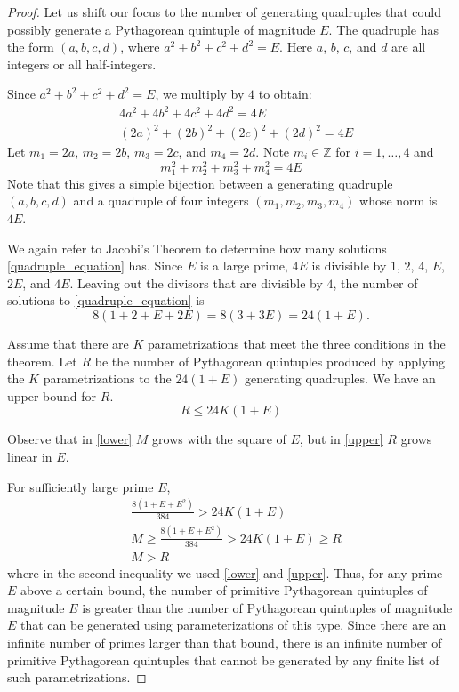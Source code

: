 \documentclass[12pt,table]{article}
\theoremstyle{definition}
\theoremstyle{remark}
\newcommand{\Zzz}{\mathbb Z}
\numberwithin{equation}{section}
\begin{document}
\begin{proof}
Let us shift our focus to the number of generating quadruples that could 
possibly generate a Pythagorean quintuple of magnitude $E$.
The quadruple has the form $(a,b,c,d)$, 
where $a^2 + b^2 + c^2 + d^2 = E$. 
Here $a$, $b$, $c$, and $d$ are all integers or all half-integers.

Since $a^2 + b^2 + c^2 + d^2 = E$, we multiply by $4$ to obtain:
\begin{align*}
     & 4a^2 + 4b^2 + 4c^2 + 4d^2 = 4E\\
     & (2a)^2 + (2b)^2 + (2c)^2 + (2d)^2 = 4E
\end{align*}
Let $m_1 = 2a$, $m_2 = 2b$, $m_3 = 2c$, 
and $m_4 = 2d$.
Note $m_i \in \Zzz$ for $i = 1, \ldots, 4$ and
\begin{equation}
\label{quadruple_equation}
m_1^2 + m_2^2 + m_3^2 + m_4^2 = 4E
\end{equation}
Note that this gives 
a simple bijection between a generating quadruple
 $(a,b,c,d)$ and a quadruple of four integers $(m_1,m_2,m_3,m_4)$ whose norm is $4E$.

We again refer to
Jacobi's Theorem to
determine how many solutions
\eqref{quadruple_equation} has.
Since $E$ is a large
prime,
$4E$ is divisible by $1$, $2$, $4$, $E$, $2E$, and $4E$. 
Leaving 
out the divisors that are divisible by $4$, 
the number of solutions to \eqref{quadruple_equation}
is 
$$
     8(1 + 2 + E + 2E) = 8(3 + 3E) = 24(1 + E).
$$


Assume that there are $K$ parametrizations
that meet the three conditions in the theorem. 
Let $R$ be the number of Pythagorean quintuples produced by applying
the $K$ parametrizations to the $24(1+E)$ generating quadruples. 
We have
an upper bound for $R$.
\begin{equation}
\label{upper}
R \leq 24K(1+E)
\end{equation}



Observe that in \eqref{lower} $M$ grows with the square of $E$, but in 
\eqref{upper} $R$ grows linear  in $E$.

For sufficiently large prime $E$, 
\begin{align*}
   & \frac{ 8(1+E+E^2) }{384} > 24K(1+E) \\
   & M \geq \frac{ 8(1+E+E^2) }{384} > 24K(1+E) \geq R \\
   & M > R
\end{align*}
where in the second inequality we used
\eqref{lower} and \eqref{upper}.
Thus, 
for any prime $E$ above a certain bound, 
the number of primitive  Pythagorean 
quintuples of magnitude $E$ is greater than the number of 
Pythagorean quintuples of magnitude $E$ that can be generated 
using parameterizations of this type.
Since there are an infinite number of primes larger 
than that bound, there is an 
infinite number of primitive  Pythagorean 
quintuples that cannot be generated by
 any finite list of such parametrizations.
\end{proof}
\end{document}
